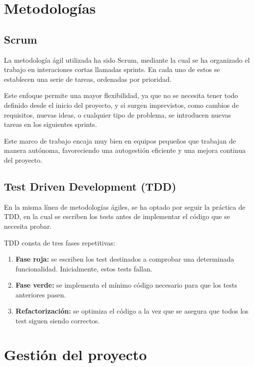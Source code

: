 
\section{Metodologías}\label{sec:metodologias}

\subsection{Scrum}\label{subsec:scrum}

La metodología ágil utilizada ha sido Scrum\cite{scrumorg:whatis}, mediante la cual se ha organizado el trabajo en
interaciones cortas llamadas sprints.
En cada uno de estos se establecen una serie de tareas, ordenadas por prioridad.

Este enfoque permite una mayor flexibilidad, ya que no se necesita tener todo definido desde el inicio del proyecto, y
si surgen imprevistos, como cambios de requisitos, nuevas ideas, o cualquier tipo de problema, se introducen nuevas tareas
en los siguientes sprints.

Este marco de trabajo encaja muy bien en equipos pequeños que trabajan de manera autónoma, favoreciendo una autogestión
eficiente y una mejora continua del proyecto.

\subsection{Test Driven Development (TDD)}\label{subsec:tdd}

En la misma línea de metodologías ágiles, se ha optado por seguir la práctica de TDD\cite{browserstack:tdd}, en la cual
se escriben los tests antes de implementar el código que se necesita probar.

TDD consta de tres fases repetitivas:

\begin{enumerate}
    \item \textbf{Fase roja:} se escriben los test destinados a comprobar una determinada funcionalidad.
    Inicialmente, estos tests fallan.
    \item \textbf{Fase verde:} se implementa el mínimo código necesario para que los tests anteriores pasen.
    \item \textbf{Refactorización:} se optimiza el código a la vez que se asegura que todos los test siguen siendo correctos.
\end{enumerate}

\section{Gestión del proyecto}\label{sec:gestion}

